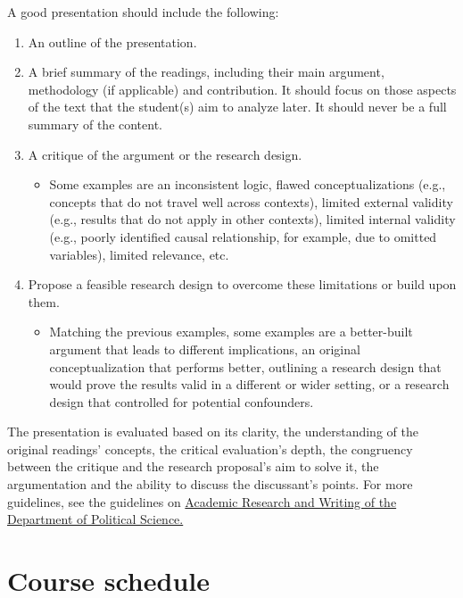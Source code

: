 \documentclass[
  12pt,
]{article}
\providecommand{\tightlist}{%
  \setlength{\itemsep}{0pt}\setlength{\parskip}{0pt}}
\begin{document}
A good presentation should include the following:

\begin{enumerate}
\def\labelenumi{\arabic{enumi}.}
\item
  An outline of the presentation.
\item
  A brief summary of the readings, including their main argument,
  methodology (if applicable) and contribution. It should focus on those
  aspects of the text that the student(s) aim to analyze later. It
  should never be a full summary of the content.
\item
  A critique of the argument or the research design.

  \begin{itemize}
  \tightlist
  \item
    Some examples are an inconsistent logic, flawed conceptualizations
    (e.g., concepts that do not travel well across contexts), limited
    external validity (e.g., results that do not apply in other
    contexts), limited internal validity (e.g., poorly identified causal
    relationship, for example, due to omitted variables), limited
    relevance, etc.
  \end{itemize}
\item
  Propose a feasible research design to overcome these limitations or
  build upon them.

  \begin{itemize}
  \tightlist
  \item
    Matching the previous examples, some examples are a better-built
    argument that leads to different implications, an original
    conceptualization that performs better, outlining a research design
    that would prove the results valid in a different or wider setting,
    or a research design that controlled for potential confounders.
  \end{itemize}
\end{enumerate}

The presentation is evaluated based on its clarity, the understanding of
the original readings' concepts, the critical evaluation's depth, the
congruency between the critique and the research proposal's aim to solve
it, the argumentation and the ability to discuss the discussant's
points. For more guidelines, see the guidelines on
\href{https://www.unilu.ch/fileadmin/fakultaeten/ksf/institute/polsem/Dok/Studium/2016-Jan_Guidelines_Booklet_engl.pdf}{Academic
Research and Writing of the Department of Political Science.}

\hypertarget{course-schedule}{%
\section{Course schedule}\label{course-schedule}}
\end{document}
